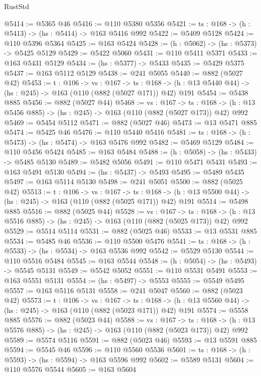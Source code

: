 \begin{lexlean}{RustStd}
\begin{coremodule}
@5414 := @5365 @46
@5416 := @110 @5380 @5356
@5421 := {ts : @168} -> (h : @5413) -> (hs : @5414) -> @163 @5416 @992
@5422 := @5409 @5128
@5424 := @110 @5396 @5364
@5425 := @163 @5424
@5428 := (h : @5062) -> (hs : @5373) -> @5425 @5129
@5429 := @5422 @5060
@5431 := @110 @5411 @5371
@5433 := @163 @5431 @5129
@5434 := (hs : @5377) -> @5433
@5435 := @5429 @5375
@5437 := @163 @5112 @5129
@5438 := @241 @5055
@5440 := @882 (@5027 @42)
@5453 := {t : @106} ->
  {vs : @167} ->
  {ts : @168} -> (h : @13 @5440 @44) -> (hs : @245) -> @163 (@110 (@882 (@5027 @171)) @42) @191
@5454 := @5438 @885
@5456 := @882 (@5027 @44)
@5468 := {vs : @167} ->
  {ts : @168} -> (h : @13 @5456 @885) -> (hs : @245) -> @163 (@110 (@882 (@5027 @173)) @42) @992
@5469 := @5454 @5112
@5471 := @882 (@5027 @46)
@5473 := @13 @5471 @885
@5474 := @5425 @46
@5476 := @110 @5440 @5416
@5481 := {ts : @168} -> (h : @5473) -> (hs : @5474) -> @163 @5476 @992
@5482 := @5469 @5129
@5484 := @110 @5456 @5424
@5485 := @163 @5484
@5488 := (h : @5058) -> (hs : @5433) -> @5485 @5130
@5489 := @5482 @5056
@5491 := @110 @5471 @5431
@5493 := @163 @5491 @5130
@5494 := (hs : @5437) -> @5493
@5495 := @5489 @5435
@5497 := @163 @5114 @5130
@5498 := @241 @5051
@5500 := @882 (@5025 @42)
@5513 := {t : @106} ->
  {vs : @167} ->
  {ts : @168} -> (h : @13 @5500 @44) -> (hs : @245) -> @163 (@110 (@882 (@5025 @171)) @42) @191
@5514 := @5498 @885
@5516 := @882 (@5025 @44)
@5528 := {vs : @167} ->
  {ts : @168} -> (h : @13 @5516 @885) -> (hs : @245) -> @163 (@110 (@882 (@5025 @173)) @42) @992
@5529 := @5514 @5114
@5531 := @882 (@5025 @46)
@5533 := @13 @5531 @885
@5534 := @5485 @46
@5536 := @110 @5500 @5476
@5541 := {ts : @168} -> (h : @5533) -> (hs : @5534) -> @163 @5536 @992
@5542 := @5529 @5130
@5544 := @110 @5516 @5484
@5545 := @163 @5544
@5548 := (h : @5054) -> (hs : @5493) -> @5545 @5131
@5549 := @5542 @5052
@5551 := @110 @5531 @5491
@5553 := @163 @5551 @5131
@5554 := (hs : @5497) -> @5553
@5555 := @5549 @5495
@5557 := @163 @5116 @5131
@5558 := @241 @5047
@5560 := @882 (@5023 @42)
@5573 := {t : @106} ->
  {vs : @167} ->
  {ts : @168} -> (h : @13 @5560 @44) -> (hs : @245) -> @163 (@110 (@882 (@5023 @171)) @42) @191
@5574 := @5558 @885
@5576 := @882 (@5023 @44)
@5588 := {vs : @167} ->
  {ts : @168} -> (h : @13 @5576 @885) -> (hs : @245) -> @163 (@110 (@882 (@5023 @173)) @42) @992
@5589 := @5574 @5116
@5591 := @882 (@5023 @46)
@5593 := @13 @5591 @885
@5594 := @5545 @46
@5596 := @110 @5560 @5536
@5601 := {ts : @168} -> (h : @5593) -> (hs : @5594) -> @163 @5596 @992
@5602 := @5589 @5131
@5604 := @110 @5576 @5544
@5605 := @163 @5604

\end{coremodule}
\end{lexlean}
